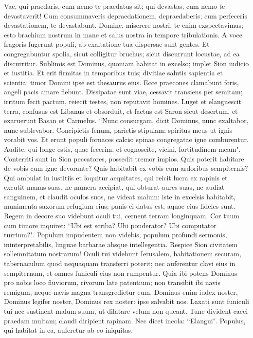 \begin{biblechapter}  
\verse Vae, qui praedaris, cum nemo te praedatus sit; qui devastas, cum nemo te devastaverit! Cum consummaveris depraedationem, depraedaberis; cum perfeceris devastationem, te devastabunt. 
\verse Domine, miserere nostri, te enim exspectavimus; esto brachium nostrum in mane et salus nostra in tempore tribulationis. 
\verse A voce fragoris fugerunt populi, ab exaltatione tua dispersae sunt gentes. 
\verse Et congregabuntur spolia, sicut colligitur bruchus; sicut discurrunt locustae, ad ea discurritur. 
\verse Sublimis est Dominus, quoniam habitat in excelso; implet Sion iudicio et iustitia. 
\verse Et erit firmitas in temporibus tuis; divitiae salutis sapientia et scientia: timor Domini ipse est thesaurus eius. 
\verse Ecce praecones clamabunt foris, angeli pacis amare flebunt. 
\verse Dissipatae sunt viae, cessavit transiens per semitam; irritum fecit pactum, reiecit testes, non reputavit homines. 
\verse Luget et elanguescit terra, confusus est Libanus et obsorduit, et factus est Saron sicut desertum, et exaruerunt Basan et Carmelus. 
\verse “Nunc consurgam, dicit Dominus, nunc exaltabor, nunc sublevabor. 
\verse Concipietis fenum, parietis stipulam; spiritus meus ut ignis vorabit vos. 
\verse Et erunt populi fornaces calcis: spinae congregatae igne comburentur. 
\verse Audite, qui longe estis, quae fecerim, et cognoscite, vicini, fortitudinem meam". 
\verse Conterriti sunt in Sion peccatores, possedit tremor impios. Quis poterit habitare de vobis cum igne devorante? Quis habitabit ex vobis cum ardoribus sempiternis? 
\verse Qui ambulat in iustitiis et loquitur aequitates, qui reicit lucra ex rapinis et excutit manus suas, ne munera accipiat, qui obturat aures suas, ne audiat sanguinem, et claudit oculos suos, ne videat malum: 
\verse iste in excelsis habitabit, munimenta saxorum refugium eius; panis ei datus est, aquae eius fideles sunt. 
\verse Regem in decore suo videbunt oculi tui, cernent terram longinquam. 
\verse Cor tuum cum timore inquiret: “Ubi est scriba? Ubi ponderator? Ubi computator turrium?". 
\verse Populum impudentem non videbis, populum profundi sermonis, ininterpretabilis, linguae barbarae absque intellegentia. 
\verse Respice Sion civitatem sollemnitatum nostrarum! Oculi tui videbunt Ierusalem, habitationem securam, tabernaculum quod nequaquam transferri poterit; nec auferentur clavi eius in sempiternum, et omnes funiculi eius non rumpentur. 
\verse Quia ibi potens Dominus pro nobis loco fluviorum, rivorum late patentium; non transibit ibi navis remigum, neque navis magna transgredietur eum. 
\verse Dominus enim iudex noster, Dominus legifer noster, Dominus rex noster: ipse salvabit nos. 
\verse Laxati sunt funiculi tui nec sustinent malum suum, ut dilatare velum non queant. Tunc divident caeci praedam multam; claudi diripient rapinam. 
\verse Nec dicet incola: “Elangui". Populus, qui habitat in ea, auferetur ab eo iniquitas. 
\end{biblechapter}

